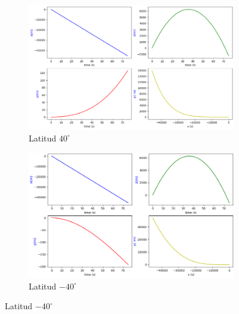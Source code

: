 \documentclass[11pt]{article}
\begin{document}
            \begin{figure}[h]
                \centering                
                \begin{subfigure}[t]{.49\textwidth}
                    \centering\includegraphics[width=\textwidth]{fotos/gráficas/40.png}
                    \caption{Latitud $40^\circ$}
                \end{subfigure}
                \begin{subfigure}[t]{.485\textwidth}
                    \centering\includegraphics[width=\textwidth]{fotos/gráficas/-40.png}
                    \caption{Latitud $-40^\circ$}
                \end{subfigure}
    

\end{figure}
\end{document}
